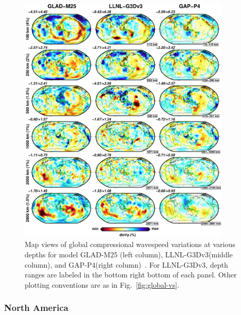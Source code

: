 \begin{figure}
\includegraphics[width=0.9\textwidth]{ch-GLADM25/figures/depth_slice/globe_vp_LLNL-GAP.pdf}
  \caption{\small{Map views of global compressional wavespeed variations at various depths for model
  GLAD-M25 (left column), LLNL-G3Dv3(middle column)\cite{simmons2012llnl}, and
  GAP-P4(right column)~\cite{fukao2013subducted}.
  For LLNL-G3Dv3, depth ranges are labeled in the bottom right
  bottom of each panel. Other plotting conventions are as in Fig.~\ref{fig:global-vs}.}}
\label{fig:global-vp}
\centering
\end{figure}

\subsubsection{North America}

